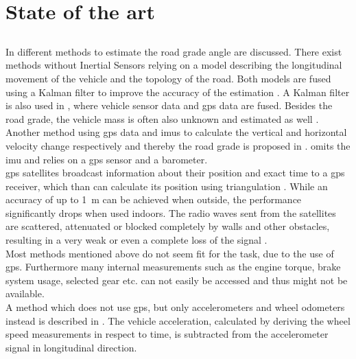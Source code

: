 \chapter{State of the art}
\label{ch:StateOfTheArt}




\section{}
In \cite{Jauch2018} different methods to estimate the road grade angle are discussed.
There exist methods without Inertial Sensors relying on a model describing the longitudinal movement of the vehicle and the topology of the road.
Both models are fused using a Kalman filter to improve the accuracy of the estimation \cite{SAHLHOLM200755}.
A Kalman filter is also used in \cite{Sahlholm2010}, where vehicle sensor data and \acrfull{gps} data are fused.
Besides the road grade, the vehicle mass is often also unknown and estimated as well \cite{Sahlholm2010,Maleej2015}.
Another method using \acrshort{gps} data and \acrshort{imu}s to calculate the vertical and horizontal velocity change respectively and thereby the road grade is proposed in \cite{Ryu2004}.
\cite{YazdaniBoroujeni2014} omits the \acrshort{imu} and relies on a \acrshort{gps} sensor and a barometer.\\
\acrshort{gps} satellites broadcast information about their position and exact time to a \acrshort{gps} receiver, which than can calculate its position using triangulation \cite{Koyuncu2010}.
While an accuracy of up to \SI{1}{\metre} can be achieved when outside, the performance significantly drops when used indoors.
The radio waves sent from the satellites are scattered, attenuated or blocked completely by walls and other obstacles, resulting in a very weak or even a complete loss of the signal \cite{Ozdenizci2015}.\\
Most methods mentioned above do not seem fit for the task, due to the use of \acrshort{gps}.
Furthermore many internal measurements such as the engine torque, brake system usage, selected gear etc. can not easily be accessed and thus might not be available.\\
A method which does not use \acrshort{gps}, but only accelerometers and wheel odometers instead is described in \cite{Nilsson2012}.
The vehicle acceleration, calculated by deriving the wheel speed measurements in respect to time, is subtracted from the accelerometer signal in longitudinal direction.
